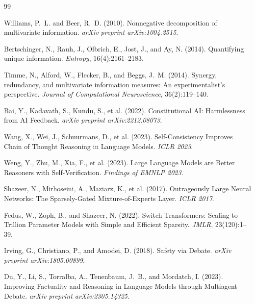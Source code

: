 \documentclass[11pt,a4paper]{article}
\theoremstyle{remark}
\begin{document}
\begin{thebibliography}{99}

Williams, P.~L. and Beer, R.~D. (2010).
\newblock Nonnegative decomposition of multivariate information.
\newblock \emph{arXiv preprint arXiv:1004.2515}.

Bertschinger, N., Rauh, J., Olbrich, E., Jost, J., and Ay, N. (2014).
\newblock Quantifying unique information.
\newblock \emph{Entropy}, 16(4):2161--2183.

Timme, N., Alford, W., Flecker, B., and Beggs, J.~M. (2014).
\newblock Synergy, redundancy, and multivariate information measures: An experimentalist's perspective.
\newblock \emph{Journal of Computational Neuroscience}, 36(2):119--140.

Bai, Y., Kadavath, S., Kundu, S., et al. (2022).
\newblock Constitutional {AI}: Harmlessness from {AI} Feedback.
\newblock \emph{arXiv preprint arXiv:2212.08073}.

Wang, X., Wei, J., Schuurmans, D., et al. (2023).
\newblock Self-Consistency Improves Chain of Thought Reasoning in Language Models.
\newblock \emph{ICLR 2023}.

Weng, Y., Zhu, M., Xia, F., et al. (2023).
\newblock Large Language Models are Better Reasoners with Self-Verification.
\newblock \emph{Findings of EMNLP 2023}.

Shazeer, N., Mirhoseini, A., Maziarz, K., et al. (2017).
\newblock Outrageously Large Neural Networks: The Sparsely-Gated Mixture-of-Experts Layer.
\newblock \emph{ICLR 2017}.

Fedus, W., Zoph, B., and Shazeer, N. (2022).
\newblock Switch Transformers: Scaling to Trillion Parameter Models with Simple and Efficient Sparsity.
\newblock \emph{JMLR}, 23(120):1--39.

Irving, G., Christiano, P., and Amodei, D. (2018).
 Safety via Debate.
\newblock \emph{arXiv preprint arXiv:1805.00899}.

Du, Y., Li, S., Torralba, A., Tenenbaum, J.~B., and Mordatch, I. (2023).
\newblock Improving Factuality and Reasoning in Language Models through Multiagent Debate.
\newblock \emph{arXiv preprint arXiv:2305.14325}.


\end{thebibliography}
\end{document}
